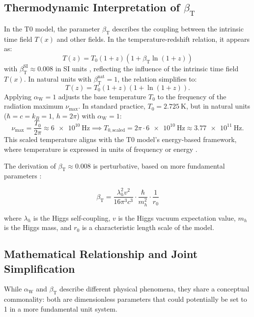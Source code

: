 \documentclass[12pt,a4paper]{article}
\newcommand{\Tfield}{T(x)}
\newcommand{\betaT}{\beta_{\text{T}}}
\newcommand{\alphaW}{\alpha_{\text{W}}}
\begin{document}
	\subsection{Thermodynamic Interpretation of \(\betaT\)}
In the T0 model, the parameter \(\betaT\) describes the coupling between the intrinsic time field \(\Tfield\) and other fields. In the temperature-redshift relation, it appears as:
\begin{equation}
	T(z) = T_0 (1 + z) (1 + \betaT \ln(1 + z))
\end{equation}
with \(\betaT^{\text{SI}} \approx 0.008\) in SI units \cite{pascher_messdifferenzen_2025}, reflecting the influence of the intrinsic time field \(\Tfield\). In natural units with \(\betaT^{\text{nat}} = 1\), the relation simplifies to:
\[
T(z) = T_0 (1 + z) (1 + \ln(1 + z)).
\]
Applying \(\alphaW = 1\) adjusts the base temperature \(T_0\) to the frequency of the radiation maximum \(\nu_{\text{max}}\). In standard practice, \(T_0 = \SI{2.725}{\kelvin}\), but in natural units (\(\hbar = c = k_B = 1\), \(h = 2\pi\)) with \(\alphaW = 1\):
\[
\nu_{\text{max}} = \frac{T_0}{2\pi} \approx \SI{6e10}{\hertz} \implies T_{0,\text{scaled}} = 2\pi \cdot \SI{6e10}{\hertz} \approx \SI{3.77e11}{\hertz}.
\]
This scaled temperature aligns with the T0 model’s energy-based framework, where temperature is expressed in units of frequency or energy \cite{pascher_alpha_2025}.


	
	The derivation of \(\betaT \approx 0.008\) is perturbative, based on more fundamental parameters \cite{pascher_params_2025}:
	
	\begin{equation}
		\betaT = \frac{\lambda_h^2 v^2}{16\pi^3 c^3} \cdot \frac{\hbar}{m_h^2} \cdot \frac{1}{r_0}
	\end{equation}
	
	where \(\lambda_h\) is the Higgs self-coupling, \(v\) is the Higgs vacuum expectation value, \(m_h\) is the Higgs mass, and \(r_0\) is a characteristic length scale of the model.
	
	\subsection{Mathematical Relationship and Joint Simplification}
	
	While \(\alphaW\) and \(\betaT\) describe different physical phenomena, they share a conceptual commonality: both are dimensionless parameters that could potentially be set to 1 in a more fundamental unit system.
	
\end{document}
